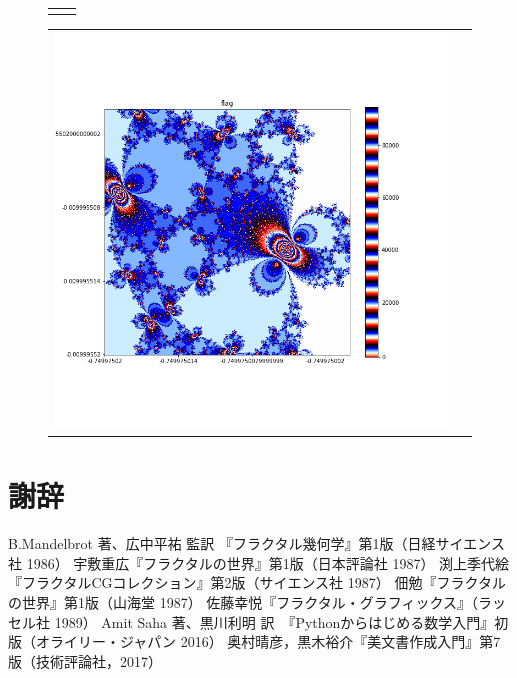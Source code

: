 \documentclass[uplatex,a4paper,11pt,oneside,openany]{jsbook}
\begin{document}
\begin{figure}[H]
\begin{tabular}{cc}
\begin{minipage}{0.5\hsize}
    \end{minipage}
  \end{tabular}
  \begin{tabular}{cc}
    \begin{minipage}{0.5\hsize}
      \centering
      \includegraphics[clip,scale=0.3]{../src/figure/fig005.png}
    \end{minipage}
    \begin{minipage}{0.5\hsize}
      \centering
    \end{minipage}
  \end{tabular}
\end{figure}%

%
\section*{謝辞}
%
\begin{thebibliography}{99}
   B.Mandelbrot 著、広中平祐 監訳 『フラクタル幾何学』第1版（日経サイエンス社 1986）
   宇敷重広『フラクタルの世界』第1版（日本評論社 1987）
   渕上季代絵『フラクタルCGコレクション』第2版（サイエンス社 1987）
   佃勉『フラクタルの世界』第1版（山海堂 1987）
   佐藤幸悦『フラクタル・グラフィックス』（ラッセル社 1989）
   Amit Saha 著、黒川利明 訳　『Pythonからはじめる数学入門』初版（オライリー・ジャパン 2016）
   奥村晴彦，黒木裕介『\LaTeXe 美文書作成入門』第7版（技術評論社，2017）
\end{thebibliography}
%
\end{document}
